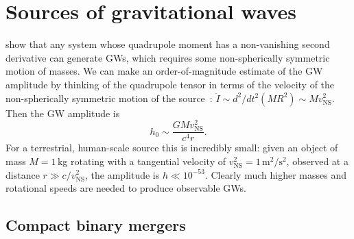 \section{Sources of gravitational waves}\label{sec:gw-sources}

 show that any system whose quadrupole moment has a non-vanishing second derivative can generate \acp{GW}, which requires some non-spherically symmetric motion of masses.
We can make an order-of-magnitude estimate of the GW amplitude by thinking of the quadrupole tensor in terms of the velocity of the non-spherically symmetric motion of the source~\citep{Misner_1973}: $\ddot{I} \sim d^2/dt^2 (M R^2) \sim M v_{\textrm{NS}}^2$.
Then the GW amplitude is
\begin{equation}
	h_0 \sim \frac{GM v_{\textrm{NS}}^2}{c^4 r}.
\end{equation}
For a terrestrial, human-scale source this is incredibly small: given an object of mass $M=1$\,kg rotating with a tangential velocity of $v_{\textrm{NS}}^2=1\,\mathrm{m^2/s^2}$, observed at a distance $r \gg c/v_{\textrm{NS}}^2$, the amplitude is $h \ll 10^{-53}$.
Clearly much higher masses and rotational speeds are needed to produce observable GWs.


\subsection{Compact binary mergers}

